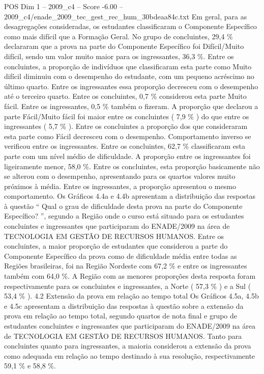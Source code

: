 \begin{textsample}{POS Dim 1 – 2009\_c4 – Score -6.00 – 2009\_c4/enade\_2009\_tec\_gest\_rec\_hum\_30bdeaa84c.txt}
Em geral, para as desagregações consideradas, os estudantes classificaram o Componente Específico como mais difícil que a Formação Geral.
No grupo de concluintes, 29,4 \% declararam que a prova na parte do Componente Específico foi Difícil/Muito difícil, sendo um valor muito maior para os ingressantes, 36,3 \%.
Entre os concluintes, a proporção de indivíduos que classificaram esta parte como Muito difícil diminuiu com o desempenho do estudante, com um pequeno acréscimo no último quarto.
Entre os ingressantes essa proporção decresceu com o desempenho até o terceiro quarto.
Entre os concluintes, 0,7 \% considerou esta parte Muito fácil.
Entre os ingressantes, 0,5 \% também o fizeram.
A proporção que declarou a parte Fácil/Muito fácil foi maior entre os concluintes ( 7,9 \% ) do que entre os ingressantes ( 5,7 \% ).
Entre os concluintes a proporção dos que consideraram esta parte como Fácil decresceu com o desempenho.
Comportamento inverso se verificou entre os ingressantes.
Entre os concluintes, 62,7 \% classificaram esta parte com um nível médio de dificuldade.
A proporção entre os ingressantes foi ligeiramente menor, 58,0 \%.
Entre os concluintes, esta proporção basicamente não se alterou com o desempenho, apresentando para os quartos valores muito próximos à média.
Entre os ingressantes, a proporção apresentou o mesmo comportamento.
Os Gráficos 4.4a e 4.4b apresentam a distribuição das respostas à questão “ Qual o grau de dificuldade desta prova na parte do Componente Específico? ”, segundo a Região onde o curso está situado para os estudantes concluintes e ingressantes que participaram do ENADE/2009 na área de TECNOLOGIA EM GESTÃO DE RECURSOS HUMANOS.
Entre os concluintes, a maior proporção de estudantes que considerou a parte do Componente Específico da prova como de dificuldade média entre todas as Regiões brasileiras, foi na Região Nordeste com 67,2 \% e entre os ingressantes também com 64,0 \%.
A Região com as menores proporções desta resposta foram respectivamente para os concluintes e ingressantes, a Norte ( 57,3 \% ) e a Sul ( 53,4 \% ). 4.2 Extensão da prova em relação ao tempo total Os Gráficos 4.5a, 4.5b e 4.5c apresentam a distribuição das respostas à questão sobre a extensão da prova em relação ao tempo total, segundo quartos de nota final e grupo de estudantes concluintes e ingressantes que participaram do ENADE/2009 na área de TECNOLOGIA EM GESTÃO DE RECURSOS HUMANOS.
Tanto para concluintes quanto para ingressantes, a maioria considerou a extensão da prova como adequada em relação ao tempo destinado à sua resolução, respectivamente 59,1 \% e 58,8 \%.

\end{textsample}
